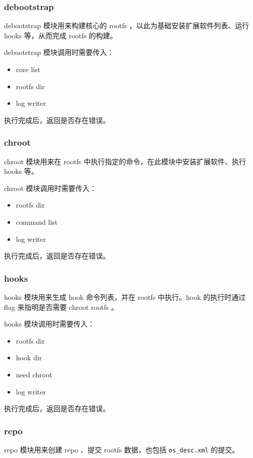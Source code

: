 \documentclass{utart}
\begin{document}
\subsubsection{debootstrap}
debootstrap 模块用来构建核心的 rootfs ，以此为基础安装扩展软件列表、运行 hooks 等，从而完成 rootfs 的构建。

debootstrap 模块调用时需要传入：
\begin{itemize}[leftmargin=4em]
\item core list
\item rootfs dir
\item log writer
\end{itemize}

执行完成后，返回是否存在错误。

\subsubsection{chroot}
chroot 模块用来在 rootfs 中执行指定的命令，在此模块中安装扩展软件、执行 hooks 等。

chroot 模块调用时需要传入：
\begin{itemize}[leftmargin=4em]
\item rootfs dir
\item command list
\item log writer
\end{itemize}

执行完成后，返回是否存在错误。

\subsubsection{hooks}
hooks 模块用来生成 hook 命令列表，并在 rootfs 中执行。hook 的执行时通过 flag 来指明是否需要 chroot rootfs 。

hooks 模块调用时需要传入：
\begin{itemize}[leftmargin=4em]
\item rootfs dir
\item hook dir
\item need chroot
\item log writer
\end{itemize}

执行完成后，返回是否存在错误。

\subsubsection{repo}
repo 模块用来创建 repo 、提交 rootfs 数据，也包括 \texttt{os\_desc.xml} 的提交。
\end{document}
